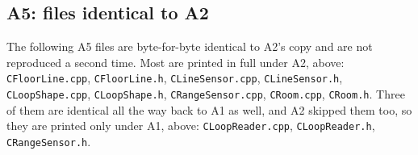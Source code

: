 
\subsection*{A5: files identical to A2}
The following A5 files are byte-for-byte identical to A2's copy and are not
reproduced a second time. Most are printed in full under A2, above:
\texttt{CFloorLine.cpp}, \texttt{CFloorLine.h}, \texttt{CLineSensor.cpp},
\texttt{CLineSensor.h}, \texttt{CLoopShape.cpp}, \texttt{CLoopShape.h},
\texttt{CRangeSensor.cpp}, \texttt{CRoom.cpp}, \texttt{CRoom.h}.
Three of them are identical all the way back to A1 as well, and A2 skipped
them too, so they are printed only under A1, above: \texttt{CLoopReader.cpp},
\texttt{CLoopReader.h}, \texttt{CRangeSensor.h}.

